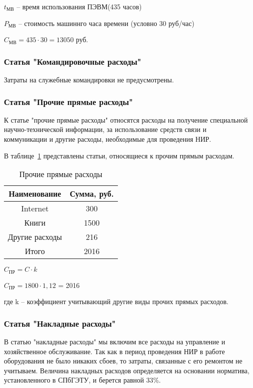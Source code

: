 $t_{\text{МВ}}$ -- время использования ПЭВМ(435 часов)

$P_{\text{МВ}}$ -- стоимость машиннго часа времени (условно 30 руб/час)

$C_{\text{МВ}} = 435 \cdot 30 = 13050$ руб.

\subsubsection{Статья "Командировочные расходы"}
Затраты на служебные командировки не предусмотрены.

\subsubsection{Статья "Прочие прямые расходы"}

К статье "прочие прямые расходы" относятся расходы на получение специальной научно-технической информации, за использование средств связи и коммуникации и другие расходы, необходимые для проведения НИР.

В таблице~\ref{table4} представлены статьи, относящиеся к прочим прямым расходам.

\begin{center}
\begin{table}\center
\caption{Прочие прямые расходы}\label{table4}
\begin{tabular}{|c|c|}
  \hline
  Наименование & Сумма, руб. \\ \hline
  Internet & 300 \\ \hline
  Книги & 1500  \\ \hline
  Другие расходы &  216 \\ \hline
  Итого & 2016\\ \hline
\end{tabular}
\end{table}


$C_{\text{ПР}} = C \cdot k$

$C_{\text{ПР}} = 1800 \cdot 1,12$ = 2016

\end{center}

где k -- коэффициент учитывающий другие виды прочих прямых расходов.

\subsubsection*{Статья "Накладные расходы"}

В статью "накладные расходы" мы включим все расходы на управление и хозяйственное обслуживание. Так как в период проведения НИР в работе оборудования не было никаких сбоев, то затраты, связанные с его ремонтом не учитываем. Величина накладных расходов определяется на основании норматива, установленного в СПбГЭТУ, и берется равной 33\%.

